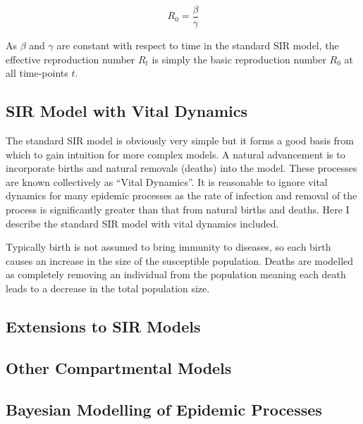 \documentclass[11pt,a4paper]{article}
\theoremstyle{break}
\begin{document}
  \[ R_0=\frac\beta\gamma \]

  \par As $\beta$ and $\gamma$ are constant with respect to time in the standard SIR model, the effective reproduction number $R_t$ is simply the basic reproduction number $R_0$ at all time-points $t$.


\subsection*{SIR Model with Vital Dynamics}

  \par The standard SIR model is obviously very simple but it forms a good basis from which to gain intuition for more complex models. A natural advancement is to incorporate births and natural removals (deaths) into the model. These processes are known collectively as ``Vital Dynamics''. It is reasonable to ignore vital dynamics for many epidemic processes as the rate of infection and removal of the process is significantly greater than that from natural births and deaths. Here I describe the standard SIR model with vital dynamics included.

  \par Typically birth is not assumed to bring immunity to diseases, so each birth causes an increase in the size of the susceptible population. Deaths are modelled as completely removing an individual from the population meaning each death leads to a decrease in the total population size.


\subsection*{Extensions to SIR Models}


\subsection*{Other Compartmental Models}


\subsection{Bayesian Modelling of Epidemic Processes}
\end{document}
